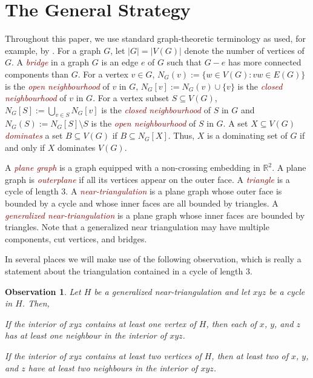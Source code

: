 \documentclass[11pt]{article}
\newcommand{\pat}[1]{\textcolor{red}{PM: #1}}
\newtheorem{obs}{Observation}
\newcommand{\defin}[1]{\emph{\textcolor{Maroon}{#1}}}
\theoremstyle{definition}
\begin{document}
%


\section{The General Strategy}
\label{strategy}

Throughout this paper, we use standard graph-theoretic terminology as used, for example, by \citet{diestel:graph}.
For a graph $G$, let $|G|=|V(G)|$ denote the number of vertices of $G$.  A \defin{bridge} in a graph $G$ is an edge $e$ of $G$ such that $G-e$ has more connected components than $G$.  For a vertex $v\in G$, $N_G(v):=\{w\in V(G):vw\in E(G)\}$ is the \defin{open neighbourhood} of $v$ in $G$,  $N_G[v]:=N_G(v)\cup\{v\}$ is the \defin{closed neighbourhood} of $v$ in $G$.  For a vertex subset $S\subseteq V(G)$, $N_G[S]:=\bigcup_{v\in S} N_{G}[v]$ is the \defin{closed neighbourhood} of $S$ in $G$ and $N_G(S):=N_G[S]\setminus S$ is the \defin{open neighbourhood} of $S$ in $G$.  A set $X\subseteq V(G)$ \defin{dominates} a set $B\subseteq V(G)$ if $B\subseteq N_G[X]$.  Thus, $X$ is a dominating set of $G$ if and only if $X$ dominates $V(G)$.

A \defin{plane graph} is a graph equipped with a non-crossing embedding in $\mathbb{R}^2$.  A plane graph is \defin{outerplane} if all its vertices appear on the outer face.  A \defin{triangle} is a cycle of length $3$. A \defin{near-triangulation} is a plane graph whose outer face is bounded by a cycle and whose inner faces are all bounded by triangles.  A \defin{generalized near-triangulation} is a plane graph whose inner faces are bounded by triangles. Note that a generalized near triangulation may have multiple components, cut vertices, and bridges.

In several places we will make use of the following observation, which is really a statement about the triangulation contained in a cycle of length $3$.
\begin{obs}\label{useful_little_guy}
  Let $H$ be a generalized near-triangulation and let $xyz$ be a cycle in $H$.  Then,
  \begin{compactenum}
    \item If the interior of $xyz$ contains at least one vertex of $H$, then each of $x$, $y$, and $z$ has at least one neighbour in the interior of $xyz$.

    \item If the interior of $xyz$ contains at least two vertices of $H$, then at least two of $x$, $y$, and $z$ have at least two neighbours in the interior of $xyz$.
  \end{compactenum}
\end{obs}
\end{document}

